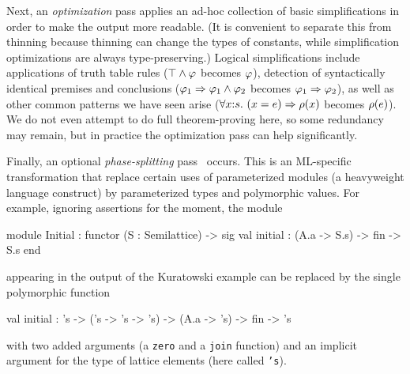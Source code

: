 Next, an \emph{optimization} pass applies an ad-hoc collection of
basic simplifications in order to make the output more readable. (It
is convenient to separate this from thinning because thinning can
change the types of constants, while simplification optimizations are
always type-preserving.)
%
%
%
Logical simplifications include applications of truth table rules
($\top\land \varphi$ becomes $\varphi$), detection of syntactically
identical premises and conclusions
($\varphi_1\Rightarrow \varphi_1\land \varphi_2$ becomes
$\varphi_1\Rightarrow \varphi_2$), as well as other common patterns we have
seen arise
($\forall x{:}s.\ (x = e)\Rightarrow \rho(x)$ becomes
$\rho(e)$). We do not even attempt to do full theorem-proving here,
so some redundancy may remain, but in practice the optimization pass
can help significantly.

Finally, an optional \emph{phase-splitting} pass~\cite{harper+:popl90}
occurs. This is an ML-specific transformation that replace certain
uses of parameterized modules (a heavyweight language construct) by
parameterized types and polymorphic values. For example, ignoring
assertions for the moment, the module
\begin{source}
module Initial : functor (S : Semilattice) ->
                    sig
                      val initial : (A.a -> S.s) -> fin -> S.s
                    end	
\end{source}   
appearing in the output of the Kuratowski example can be replaced by the single polymorphic function
\begin{source}
val initial : 's -> ('s -> 's -> 's) -> (A.a -> 's) -> fin -> 's	
\end{source}
with two added arguments (a \texttt{zero} and a \texttt{join} function) and an implicit argument for the type of lattice elements (here called \texttt{'s}).


\label{sec:typechecking}



